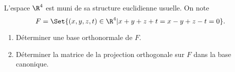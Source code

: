 \begin{enonce}
\begin{exercise}[ID={RMS 124 E1224 CCP PSI},subtitle={},tags={}, difficulty={0}]
L'espace $\R^4$ est muni de sa structure euclidienne usuelle.
On note 
\begin{equation*}
F=\Set{\left( x,y,z,t \right)\in\R^4 | x+y+z+t = x-y+z-t = 0}.
\end{equation*}
\begin{enumerate}
  \item Déterminer une base orthonormale de $F$.
  \item Déterminer la matrice de la projection orthogonale sur $F$ dans la base
    canonique.
\end{enumerate}
\end{exercise}
\begin{solution}
\end{solution}
\end{enonce}
